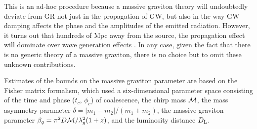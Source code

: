 %
This is an ad-hoc procedure
because a massive graviton theory will undoubtedly deviate from GR not 
just in the propagation of GW, but also in the way GW damping affects 
the phase and the amplitudes of the emitted radiation.  
However, it turns out that hundreds of Mpc away from the source,
the propagation effect will dominate over wave generation effects \cite{AW09}.  
In any case, given the fact that there is no generic theory of a massive 
graviton, there is no choice but to omit these unknown contributions.

Estimates of the bounds on the massive graviton parameter are based
on the Fisher matrix formalism,  
which used a six-dimensional parameter space consisting of the time 
and phase ($t_c, \, \phi_c$) of coalescence, the chirp mass ${\cal M}$, 
the mass asymmetry parameter $\delta=|m_1-m_2|/(m_1+m_2)$, the massive 
graviton parameter $\beta_g=\pi^2 D {\cal M}/\lambda_g^2(1+z)$, 
and the luminosity distance $D_{\rm L}$.  

